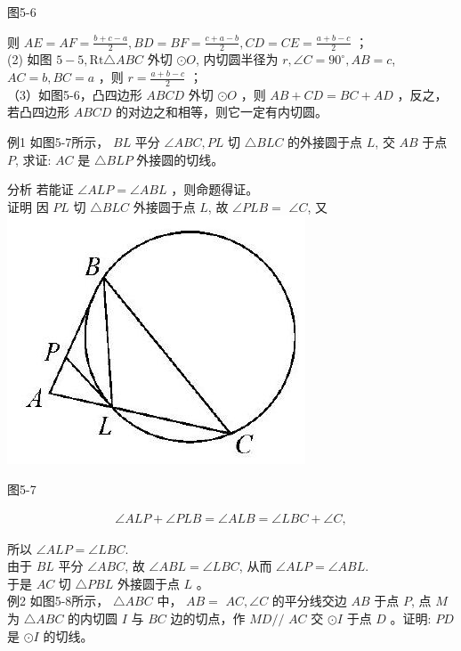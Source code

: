 \documentclass[10pt]{article}
\begin{document}
图5-6

则 $A E=A F=\frac{b+c-a}{2}, B D=B F=\frac{c+a-b}{2}, C D=C E=\frac{a+b-c}{2}$ ；\\
(2) 如图 $5-5, \mathrm{Rt} \triangle A B C$ 外切 $\odot O$, 内切圆半径为 $r, \angle C=90^{\circ}, A B=c$, $A C=b, B C=a$ ，则 $r=\frac{a+b-c}{2}$ ；\\
（3）如图5-6，凸四边形 $A B C D$ 外切 $\odot O$ ，则 $A B+C D=B C+A D$ ，反之，若凸四边形 $A B C D$ 的对边之和相等，则它一定有内切圆。

例1 如图5-7所示， $B L$ 平分 $\angle A B C, P L$ 切 $\triangle B L C$ 的外接圆于点 $L$, 交 $A B$ 于点 $P$, 求证: $A C$ 是 $\triangle B L P$ 外接圆的切线。

分析 若能证 $\angle A L P=\angle A B L$ ，则命题得证。\\
证明 因 $P L$ 切 $\triangle B L C$ 外接圆于点 $L$, 故 $\angle P L B=$ $\angle C$, 又\\
\includegraphics[max width=\textwidth, center]{2024_10_30_66b8e5e701da2093c133g-035(2)}

图5-7

\begin{align*}
\angle A L P+\angle P L B=\angle A L B=\angle L B C+\angle C,
\end{align*}

所以 $\angle A L P=\angle L B C$.\\
由于 $B L$ 平分 $\angle A B C$, 故 $\angle A B L=\angle L B C$, 从而 $\angle A L P=\angle A B L$.\\
于是 $A C$ 切 $\triangle P B L$ 外接圆于点 $L$ 。\\
例2 如图5-8所示， $\triangle A B C$ 中， $A B=$ $A C, \angle C$ 的平分线交边 $A B$ 于点 $P$, 点 $M$ 为 $\triangle A B C$ 的内切圆 $I$ 与 $B C$ 边的切点，作 $M D / /$ $A C$ 交 $\odot I$ 于点 $D$ 。证明: $P D$ 是 $\odot I$ 的切线。
\end{document}
